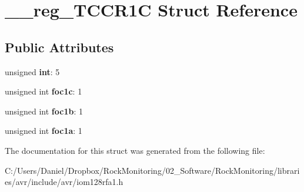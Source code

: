 \hypertarget{struct____reg___t_c_c_r1_c}{}\section{\+\_\+\+\_\+reg\+\_\+\+T\+C\+C\+R1C Struct Reference}
\label{struct____reg___t_c_c_r1_c}
\subsection*{Public Attributes}
\begin{DoxyCompactItemize}
\item 
unsigned {\bfseries int}\+: 5\hypertarget{struct____reg___t_c_c_r1_c_a0c4a950a72d5f668f3181f2f76b1e25e}{}\label{struct____reg___t_c_c_r1_c_a0c4a950a72d5f668f3181f2f76b1e25e}

\item 
unsigned int {\bfseries foc1c}\+: 1\hypertarget{struct____reg___t_c_c_r1_c_abfb3bbbc45fbae8b7d16c28d059af72a}{}\label{struct____reg___t_c_c_r1_c_abfb3bbbc45fbae8b7d16c28d059af72a}

\item 
unsigned int {\bfseries foc1b}\+: 1\hypertarget{struct____reg___t_c_c_r1_c_ac08293147b4791096b235009d070559f}{}\label{struct____reg___t_c_c_r1_c_ac08293147b4791096b235009d070559f}

\item 
unsigned int {\bfseries foc1a}\+: 1\hypertarget{struct____reg___t_c_c_r1_c_a9d7458ea727f2a0596ba050bd5dde3df}{}\label{struct____reg___t_c_c_r1_c_a9d7458ea727f2a0596ba050bd5dde3df}

\end{DoxyCompactItemize}


The documentation for this struct was generated from the following file\+:\begin{DoxyCompactItemize}
\item 
C\+:/\+Users/\+Daniel/\+Dropbox/\+Rock\+Monitoring/02\+\_\+\+Software/\+Rock\+Monitoring/libraries/avr/include/avr/iom128rfa1.\+h\end{DoxyCompactItemize}
